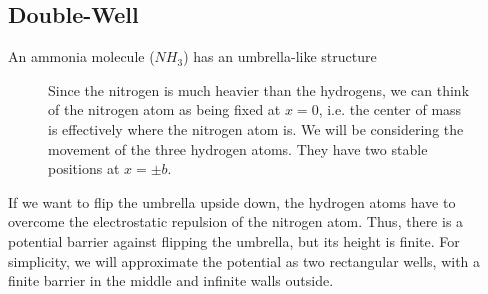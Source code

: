 \documentclass{article}
\begin{document}
\subsection{Double-Well}
An ammonia molecule ($N H_3$) has an umbrella-like structure

\begin{figure}[H]
    \centering
    \begin{minipage}[c]{0.55\linewidth}
        \centering
    \end{minipage}%
    \begin{minipage}[c]{0.45\linewidth}
        Since the nitrogen is much heavier than the hydrogens, we can think of the nitrogen atom as being fixed at $x=0$, i.e. the center of mass is effectively where the nitrogen atom is. We will be considering the movement of the three hydrogen atoms. They have two stable positions at $x=\pm b$.
    \end{minipage}
\end{figure}

If we want to flip the umbrella upside down, the hydrogen atoms have to overcome the electrostatic repulsion of the nitrogen atom. Thus, there is a potential barrier against flipping the umbrella, but its height is finite. For simplicity, we will approximate the potential as two rectangular wells, with a finite barrier in the middle and infinite walls outside.
\end{document}
